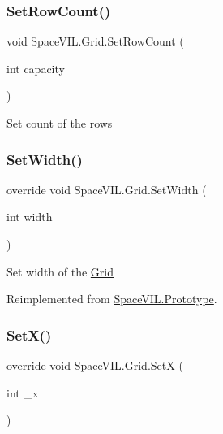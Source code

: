 \mbox{\label{class_space_v_i_l_1_1_grid_a62b1f61a50a5cceefcee8c881f92e641}} 
\subsubsection{\texorpdfstring{Set\+Row\+Count()}{SetRowCount()}}
{\footnotesize\ttfamily void Space\+V\+I\+L.\+Grid.\+Set\+Row\+Count (\begin{DoxyParamCaption}\item[{int}]{capacity }\end{DoxyParamCaption})}



Set count of the rows 

\mbox{\label{class_space_v_i_l_1_1_grid_a2d3ce59b92ad9ca3bba2fb69feb549cb}} 
\subsubsection{\texorpdfstring{Set\+Width()}{SetWidth()}}
{\footnotesize\ttfamily override void Space\+V\+I\+L.\+Grid.\+Set\+Width (\begin{DoxyParamCaption}\item[{int}]{width }\end{DoxyParamCaption})\hspace{0.3cm}{\ttfamily [virtual]}}



Set width of the \mbox{\hyperlink{class_space_v_i_l_1_1_grid}{Grid}} 



Reimplemented from \mbox{\hyperlink{class_space_v_i_l_1_1_prototype_a6a4f1b9581f4d18f1c3a3e287d4b2a2b}{Space\+V\+I\+L.\+Prototype}}.

\mbox{\label{class_space_v_i_l_1_1_grid_a28b973b0fddabf73166c9a24946e2e59}} 
\subsubsection{\texorpdfstring{Set\+X()}{SetX()}}
{\footnotesize\ttfamily override void Space\+V\+I\+L.\+Grid.\+SetX (\begin{DoxyParamCaption}\item[{int}]{\+\_\+x }\end{DoxyParamCaption})\hspace{0.3cm}{\ttfamily [virtual]}}




